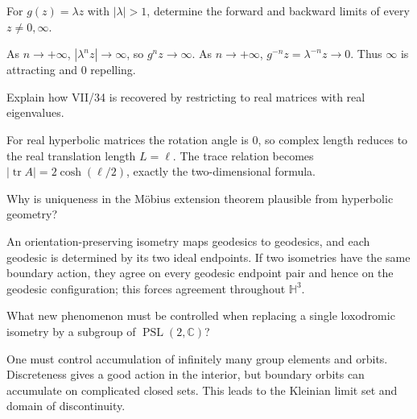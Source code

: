 \begin{problem}\label{prob:vii36-ch02}
For \(g(z)=\lambda z\) with \(|\lambda|>1\), determine the forward and backward limits of every \(z\ne0,\infty\).
\end{problem}

\begin{solution}
As \(n\to+\infty\), \(|\lambda^n z|\to\infty\), so \(g^nz\to\infty\).  As \(n\to+\infty\), \(g^{-n}z=\lambda^{-n}z\to0\).  Thus \(\infty\) is attracting and \(0\) repelling.
\end{solution}

\begin{problem}\label{prob:vii36-ch03}
Explain how VII/34 is recovered by restricting to real matrices with real eigenvalues.
\end{problem}

\begin{solution}
For real hyperbolic matrices the rotation angle is \(0\), so complex length reduces to the real translation length \(L=\ell\).  The trace relation becomes \(|\operatorname{tr}A|=2\cosh(\ell/2)\), exactly the two-dimensional formula.
\end{solution}

\begin{problem}\label{prob:vii36-ch04}
Why is uniqueness in the Möbius extension theorem plausible from hyperbolic geometry?
\end{problem}

\begin{solution}
An orientation-preserving isometry maps geodesics to geodesics, and each geodesic is determined by its two ideal endpoints.  If two isometries have the same boundary action, they agree on every geodesic endpoint pair and hence on the geodesic configuration; this forces agreement throughout \(\mathbb H^3\).
\end{solution}

\begin{problem}\label{prob:vii36-ch05}
What new phenomenon must be controlled when replacing a single loxodromic isometry by a subgroup of \(\operatorname{PSL}(2,\mathbb C)\)?
\end{problem}

\begin{solution}
One must control accumulation of infinitely many group elements and orbits.  Discreteness gives a good action in the interior, but boundary orbits can accumulate on complicated closed sets.  This leads to the Kleinian limit set and domain of discontinuity.
\end{solution}
